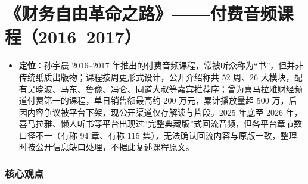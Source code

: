 \section{《财务自由革命之路》------付费音频课程（2016--2017）}

\begin{itemize}
\tightlist
\item
  \textbf{定位}：孙宇晨 2016--2017
  年推出的付费音频课程，常被听众称为``书''，但并非传统纸质出版物；课程按周更形式设计，公开介绍称共
  52 周、26
  大模块，配有吴晓波、马东、鲁豫、冯仑、同道大叔等嘉宾推荐序；曾为喜马拉雅财经频道付费第一的课程，单日销售额最高约
  200 万元，累计播放量超 500
  万，后因内容争议被平台下架，现公开渠道仅存解读与片段。2025 年底至 2026
  年，喜马拉雅、懒人听书等平台出现过``完整典藏版''式回流音频，但各平台章节数口径不一（有称
  94 章、有称 115
  集），无法确认回流内容与原版一致，整理时按公开信息缺口处理，不据此复述课程原文。
\end{itemize}

\subsubsection*{核心观点}

